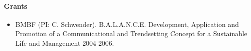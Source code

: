 \begin{bibunit}[apalike]
\nocite{*}
\putbib[profClemensSchwender]
\end{bibunit}

\paragraph{Grants}

\begin{itemize}
\item BMBF (PI: C. Schwender). B.A.L.A.N.C.E. Development, Application and Promotion of a Communicational and Trendsetting Concept for a Sustainable Life and Management 2004-2006.
\end{itemize}